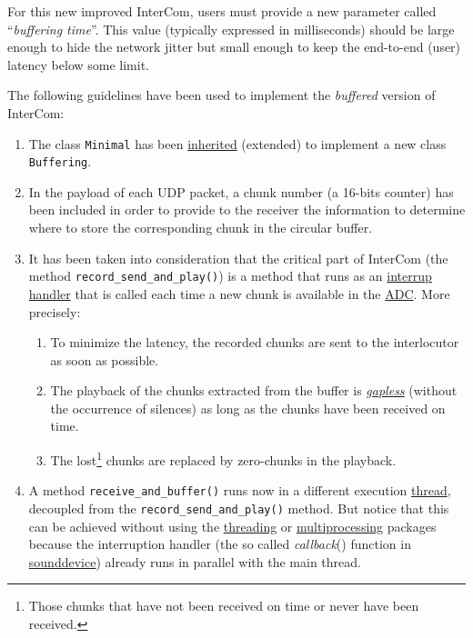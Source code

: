 For this new improved InterCom, users must provide a new parameter
called ``\emph{buffering time}''. This value (typically expressed in
milliseconds) should be large enough to hide the network jitter but
small enough to keep the end-to-end (user) latency below some limit.

The following guidelines have been used to implement the
\emph{buffered} version of InterCom:

\begin{enumerate}
\item The class \texttt{Minimal} has been
  \href{https://en.wikipedia.org/wiki/Inheritance_(object-oriented_programming)}{inherited}
  (extended) to implement a new class \texttt{Buffering}.
\item In the payload of each UDP packet, a chunk number (a 16-bits
  counter) has been included in order to provide to the receiver the
  information to determine where to store the corresponding chunk in
  the circular buffer.
\item It has been taken into consideration that the critical part of
  InterCom (the method \verb|record_send_and_play()|) is a method that
  runs as an
  \href{https://en.wikipedia.org/wiki/Interrupt_handler}{interrup
    handler} that is called each time a new chunk is available in the
  \href{https://en.wikipedia.org/wiki/Analog-to-digital_converter}{ADC}. More
  precisely:
  \begin{enumerate}
  \item To minimize the latency, the recorded chunks are sent
    to the interlocutor as soon as possible.
  \item The playback of the chunks extracted from the buffer is
    \href{https://en.wikipedia.org/wiki/Gapless_playback}{\emph{gapless}}
    (without the occurrence of silences) as long as the chunks have
    been received on time.
  \item The lost\footnote{Those chunks that have not been
  received on time or never have been received.} chunks are replaced
    by zero-chunks in the playback.
  \end{enumerate}
\item A method \verb|receive_and_buffer()| runs now in a different
  execution
  \href{https://en.wikipedia.org/wiki/Thread_(computing)}{thread},
  decoupled from the \verb|record_send_and_play()| method. But notice
  that this can be achieved without using the
  \href{https://docs.python.org/3/library/threading.html}{threading}
  or
  \href{https://docs.python.org/3/library/multiprocessing.html}{multiprocessing}
  packages because the interruption handler (the so called
  \emph{callback}() function in
  \href{https://python-sounddevice.readthedocs.io/en/0.3.14/api.html}{sounddevice})
  already runs in parallel with the main thread.
\end{enumerate}

